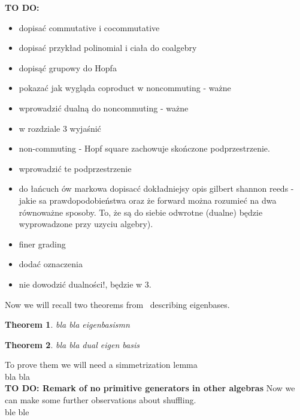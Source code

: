 \documentclass[a4paper]{article}
\newtheorem{theorem}{Theorem}
\newcommand{\todo}[1]{\hfill \break \textbf{\Huge TO DO: #1 \hfill \break}\normalsize}
\begin{document}
\todo{}
\begin{itemize}
\item dopisać commutative i cocommutative
\item dopisać przykład polinomial i ciała do coalgebry
\item dopisąć grupowy do Hopfa
\item pokazać jak wygląda coproduct w noncommuting - ważne
\item wprowadzić dualną do noncommuting - ważne
\item w rozdziale 3 wyjaśnić
\item non-commuting - Hopf square zachowuje skończone podprzestrzenie.
\item wprowadzić te podprzestrzenie
\item do łańcuch ów markowa dopisacć dokładniejsy opis gilbert shannon reeds - jakie sa prawdopodobieństwa
oraz że forward można rozumieć na dwa równoważne sposoby. To, że są do siebie odwrotne (dualne) będzie
wyprowadzone przy uzyciu algebry).
\item finer grading
\item dodać oznaczenia
\item nie dowodzić dualności!, będzie w 3.
\end{itemize}

Now we will recall two theorems from~\cite{Diaconis2014} describing eigenbases.
\begin{theorem}
bla bla eigenbasismn
\end{theorem}
\begin{theorem}
bla bla dual eigen basis
\end{theorem}
To prove them we will need a simmetrization lemma \\
bla bla\\[8pt]
\todo{Remark of no primitive generators in other algebras}
Now we can make some further observations about shuffling.\\
ble ble\\
\end{document}
